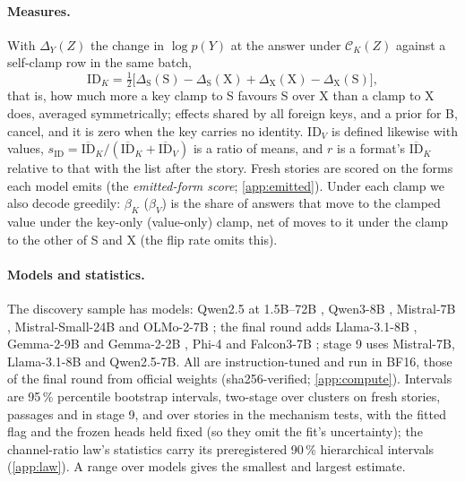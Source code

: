 \paragraph{Measures.}
With $\Delta_Y(Z)$ the change in $\log p(Y)$ at the answer under $\mathcal{C}_K(Z)$ against a self-clamp row in the same batch,
\begin{equation}\label{eq:idk}
\mathrm{ID}_K = \tfrac{1}{2}\big[\Delta_{\mathrm{S}}(\mathrm{S}) - \Delta_{\mathrm{S}}(\mathrm{X}) + \Delta_{\mathrm{X}}(\mathrm{X}) - \Delta_{\mathrm{X}}(\mathrm{S})\big],
\end{equation}
that is, how much more a key clamp to S favours S over X than a clamp to X does, averaged symmetrically; effects shared by all foreign keys, and a prior for B, cancel, and it is zero when the key carries no identity. $\mathrm{ID}_V$ is defined likewise with values, $s_{\mathrm{ID}} = \overline{\mathrm{ID}}_K/(\overline{\mathrm{ID}}_K + \overline{\mathrm{ID}}_V)$ is a ratio of means, and $r$ is a format's $\overline{\mathrm{ID}}_K$ relative to that with the list after the story. Fresh stories are scored on the forms each model emits (the \emph{emitted-form score}; \cref{app:emitted}). Under each clamp we also decode greedily: $\beta_K$ ($\beta_V$) is the share of answers that move to the clamped value under the key-only (value-only) clamp, net of moves to it under the clamp to the other of S and X (the flip rate omits this).

\paragraph{Models and statistics.}
The discovery sample has \nModels{} models: Qwen2.5 at 1.5B--72B \citep{yang2024qwen25}, Qwen3-8B \citep{yang2025qwen3}, Mistral-7B \citep{jiang2023mistral}, Mistral-Small-24B \citep{mistral2025small} and OLMo-2-7B \citep{olmo2025two}; the final round adds Llama-3.1-8B \citep{grattafiori2024llama3}, Gemma-2-9B and Gemma-2-2B \citep{gemma2024gemma2}, Phi-4 \citep{abdin2024phi4} and Falcon3-7B \citep{tii2024falcon3}; stage 9 uses Mistral-7B, Llama-3.1-8B and Qwen2.5-7B. All are instruction-tuned and run in BF16, those of the final round from official weights (sha256-verified; \cref{app:compute}). Intervals are 95\,\% percentile bootstrap intervals, two-stage over clusters on fresh stories, passages and in stage 9, and over stories in the mechanism tests, with the fitted flag and the frozen heads held fixed (so they omit the fit's uncertainty); the channel-ratio law's statistics carry its preregistered 90\,\% hierarchical intervals (\cref{app:law}). A range over models gives the smallest and largest estimate.

